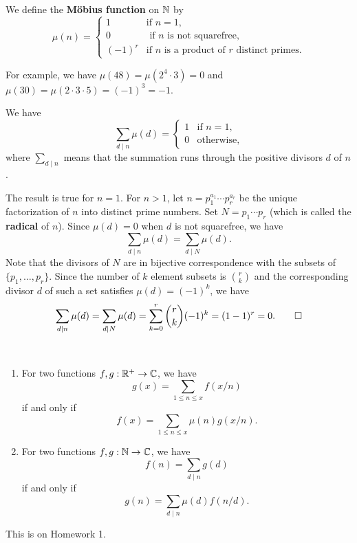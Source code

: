\begin{defn}\label{def:2.3}
We define the {\bf M\"obius function} on $\mathbb{N}$ by 
\[ \mu(n) = \begin{cases} 1 & \text{if } n = 1, \\ 0 & \text{ if $n$ is not squarefree,} \\ 
(-1)^r & \text{if $n$ is a product of $r$ distinct primes.} \end{cases} \]
\end{defn}
For example, we have $\mu(48) = \mu(2^4 \cdot 3) = 0$ and $\mu(30) = \mu(2 \cdot 3 \cdot 5) = 
(-1)^3 = -1$. 

\begin{prop}\label{prop:2.4}
We have 
\[ \sum_{d \mid n} \mu(d) = \begin{cases} 1 & \text{if } n = 1, \\ 0 & \text{otherwise,} \end{cases} \]
where $\sum_{d\mid n}$ means that the summation runs through the positive divisors $d$ of $n$. 
\end{prop}
\begin{pf}
The result is true for $n = 1$. For $n > 1$, let $n = p_1^{a_1} \cdots p_r^{a_r}$ be the unique 
factorization of $n$ into distinct prime numbers. Set $N = p_1 \cdots p_r$ (which is called the 
{\bf radical} of $n$). Since $\mu(d) = 0$ when $d$ is not squarefree, we have 
\[ \sum_{d\mid n} \mu(d) = \sum_{d\mid N} \mu(d). \]
Note that the divisors of $N$ are in bijective correspondence with the subsets of $\{p_1, \dots, p_r\}$. 
Since the number of $k$ element subsets is $\binom{r}{k}$ and the corresponding divisor $d$ of such 
a set satisfies $\mu(d) = (-1)^k$, we have 
\[ \sum_{d \mid n} \mu(d) = \sum_{d \mid N} \mu(d) = \sum_{k=0}^r \binom rk (-1)^k = (1-1)^r = 0. \qedhere \]
\end{pf}

\begin{prop}\label{prop:2.5}~
\begin{enumerate}[(1)]
    \item For two functions $f, g : \mathbb{R}^+ \to \mathbb{C}$, we have 
    \[ g(x) = \sum_{1 \leq n \leq x} f(x/n) \]
    if and only if 
    \[ f(x) = \sum_{1 \leq n \leq x} \mu(n) g(x/n). \]
    \item For two functions $f, g : \mathbb{N} \to \mathbb{C}$, we have 
    \[ f(n) = \sum_{d \mid n} g(d) \]
    if and only if 
    \[ g(n) = \sum_{d \mid n} \mu(d) f(n/d). \]
\end{enumerate}
\end{prop}
\begin{pf}
This is on Homework 1.
\end{pf}

